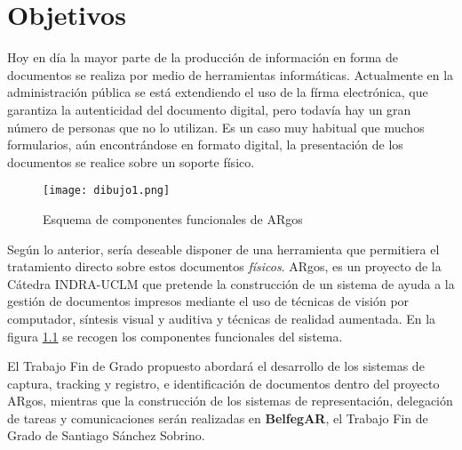 \chapter{Objetivos}
\label{chap:objetivos}




Hoy en día la mayor parte de la producción de información en forma de documentos se realiza por medio de herramientas informáticas. Actualmente en la administración pública se está extendiendo el uso de la fírma electrónica, que garantiza la autenticidad del documento digital, pero todavía hay un gran número de personas que no lo utilizan. Es un caso muy habitual que muchos formularios, aún encontrándose en formato digital, la presentación de los documentos se realice sobre un soporte físico. %
\begin{figure}[h!]
  \begin{center}
      \texttt{[image: dibujo1.png]}
      \caption{Esquema de componentes funcionales de ARgos}
      \label{fig:diagrama_argos}
    \end{center}
\end{figure}
   
Según lo anterior, sería deseable disponer de  una herramienta que permitiera el tratamiento directo sobre estos documentos \textit{físicos}.  ARgos, es un proyecto de la Cátedra INDRA-UCLM que pretende la construcción de un sistema de ayuda a la gestión de documentos impresos mediante el uso de técnicas de visión por computador, síntesis visual y auditiva y técnicas de realidad aumentada. En la figura \ref{fig:diagrama_argos} se recogen los componentes funcionales del sistema.


El Trabajo Fin de Grado propuesto abordará el desarrollo de los sistemas de captura, tracking y registro, e identificación de documentos dentro del proyecto ARgos, mientras que la construcción de los sistemas de representación, delegación de tareas y comunicaciones serán realizadas en \textbf{BelfegAR}, el Trabajo Fin de Grado de Santiago Sánchez Sobrino. 

